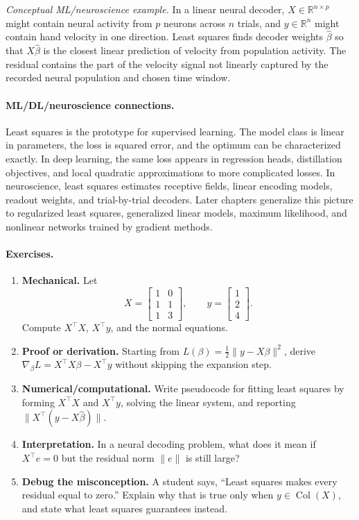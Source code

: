 \emph{Conceptual ML/neuroscience example.} In a linear neural decoder, \(X\in\mathbb{R}^{n\times p}\) might contain neural activity from \(p\) neurons across \(n\) trials, and \(y\in\mathbb{R}^n\) might contain hand velocity in one direction. Least squares finds decoder weights \(\hat\beta\) so that \(X\hat\beta\) is the closest linear prediction of velocity from population activity. The residual contains the part of the velocity signal not linearly captured by the recorded neural population and chosen time window.

\paragraph{ML/DL/neuroscience connections.}
Least squares is the prototype for supervised learning. The model class is linear in parameters, the loss is squared error, and the optimum can be characterized exactly. In deep learning, the same loss appears in regression heads, distillation objectives, and local quadratic approximations to more complicated losses. In neuroscience, least squares estimates receptive fields, linear encoding models, readout weights, and trial-by-trial decoders. Later chapters generalize this picture to regularized least squares, generalized linear models, maximum likelihood, and nonlinear networks trained by gradient methods.

\paragraph{Exercises.}
\begin{enumerate}[label=\textbf{5.2.\arabic*.}, leftmargin=*]
\item \textbf{Mechanical.} Let
\[
X=\begin{bmatrix}1&0\\1&1\\1&3\end{bmatrix},
\qquad
y=\begin{bmatrix}1\\2\\4\end{bmatrix}.
\]
Compute \(X^\top X\), \(X^\top y\), and the normal equations.
\item \textbf{Proof or derivation.} Starting from \(L(\beta)=\frac12\|y-X\beta\|^2\), derive \(\nabla_\beta L=X^\top X\beta-X^\top y\) without skipping the expansion step.
\item \textbf{Numerical/computational.} Write pseudocode for fitting least squares by forming \(X^\top X\) and \(X^\top y\), solving the linear system, and reporting \(\|X^\top(y-X\hat\beta)\|\).
\item \textbf{Interpretation.} In a neural decoding problem, what does it mean if \(X^\top e=0\) but the residual norm \(\|e\|\) is still large?
\item \textbf{Debug the misconception.} A student says, ``Least squares makes every residual equal to zero.'' Explain why that is true only when \(y\in\operatorname{Col}(X)\), and state what least squares guarantees instead.
\end{enumerate}

